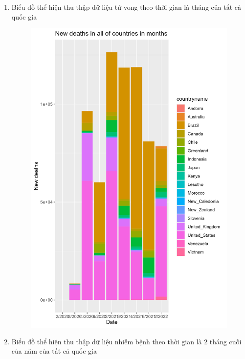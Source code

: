 \documentclass[a4paper]{article}
\theoremstyle{definition}
\begin{document}
\begin{enumerate}[i)]
\begin{enumerate}[1]
\begin{figure}[H]
			\end{figure}
			\item Biểu đồ thể hiện thu thập dữ liệu tử vong theo thời gian là tháng của tất cả quốc gia
			\begin{figure}[H]
				\centering
				\includegraphics[scale=0.2]{images/7.2.png}
			\end{figure}
			\item Biểu đồ thể hiện thu thập dữ liệu nhiễm bệnh theo thời gian là 2 tháng cuối của năm của tất cả quốc gia
			\begin{figure}[H]
				\centering

\end{figure}
\end{enumerate}
\end{enumerate}
\end{document}
